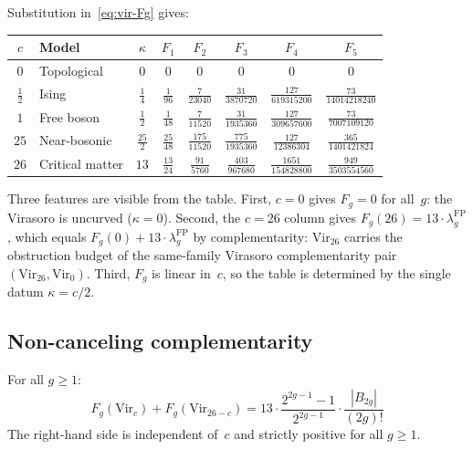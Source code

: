 \begin{computation}\label{comp:vir-physical-cc}

Substitution in~\eqref{eq:vir-Fg} gives:

\medskip
\begin{center}
\renewcommand{\arraystretch}{1.3}
{\footnotesize
\begin{tabular}{clcccccc}
\toprule
$c$ & Model & $\kappa$ & $F_1$ & $F_2$ & $F_3$ & $F_4$ & $F_5$ \\
\midrule
$0$ & Topological & $0$ & $0$ & $0$ & $0$ & $0$ & $0$ \\[3pt]
$\frac{1}{2}$ & Ising & $\frac{1}{4}$ & $\frac{1}{96}$ & $\frac{7}{23040}$ & $\frac{31}{3870720}$ & $\frac{127}{619315200}$ & $\frac{73}{14014218240}$ \\[6pt]
$1$ & Free boson & $\frac{1}{2}$ & $\frac{1}{48}$ & $\frac{7}{11520}$ & $\frac{31}{1935360}$ & $\frac{127}{309657600}$ & $\frac{73}{7007109120}$ \\[6pt]
$25$ & Near-bosonic & $\frac{25}{2}$ & $\frac{25}{48}$ & $\frac{175}{11520}$ & $\frac{775}{1935360}$ & $\frac{127}{12386304}$ & $\frac{365}{1401421824}$ \\[6pt]
$26$ & Critical matter & $13$ & $\frac{13}{24}$ & $\frac{91}{5760}$ & $\frac{403}{967680}$ & $\frac{1651}{154828800}$ & $\frac{949}{3503554560}$ \\[3pt]
\bottomrule
\end{tabular}
}
\end{center}

\medskip
\noindent
Three features are visible from the table. First, $c = 0$ gives
$F_g = 0$ for all~$g$: the Virasoro is uncurved ($\kappa = 0$).
Second, the $c = 26$ column gives
$F_g(26) = 13 \cdot \lambda_g^{\mathrm{FP}}$, which equals
$F_g(0) + 13 \cdot \lambda_g^{\mathrm{FP}}$ by complementarity:
$\mathrm{Vir}_{26}$ carries the obstruction budget of the
same-family Virasoro complementarity pair
$(\mathrm{Vir}_{26}, \mathrm{Vir}_0)$. Third, $F_g$ is linear in~$c$,
so the table is determined by the single datum $\kappa = c/2$.
\end{computation}

\subsection{Non-canceling complementarity}\label{subsec:vir-complementarity}

\begin{proposition}\label{prop:vir-complementarity}

For all $g \geq 1$:
\begin{equation}\label{eq:vir-complementarity-allgenera}
F_g(\mathrm{Vir}_c) + F_g(\mathrm{Vir}_{26-c}) = 13 \cdot \frac{2^{2g-1}-1}{2^{2g-1}} \cdot \frac{|B_{2g}|}{(2g)!}
\end{equation}
The right-hand side is independent of~$c$ and strictly positive for all $g \geq 1$.
\end{proposition}

